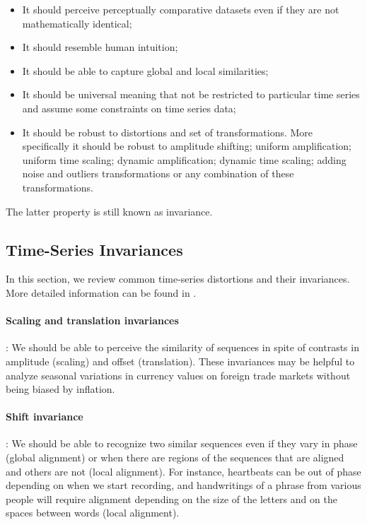 \begin{itemize}
\item It should perceive perceptually comparative datasets even if  they are not mathematically identical;
\item It should resemble human intuition;
\item It should be able to capture global and local similarities;
\item It should be universal meaning that not be restricted to particular time series and assume some constraints on time series data;
\item It should be robust to distortions and set of transformations. More specifically it should be robust to amplitude
shifting; uniform amplification; uniform time scaling; dynamic amplification; dynamic time scaling; adding noise and outliers transformations or any combination of these transformations.
\end{itemize}
The latter property is still known as invariance.

\subsection{Time-Series Invariances}
In this section, we review common time-series distortions and their invariances. More detailed information can be found in \cite{batista2014cid}. 

\paragraph{Scaling and translation invariances}:  We should be able to perceive the similarity of sequences in spite of contrasts in amplitude (scaling) and offset (translation). These invariances may be helpful to analyze seasonal variations in currency values on foreign trade markets without being biased by inflation.


\paragraph{Shift invariance}:  We should be able to recognize two similar sequences even if they vary in phase (global alignment) or when there are regions of the sequences that are aligned and others are not (local alignment). For instance, heartbeats can be out of phase depending on when we start recording, and handwritings of a phrase from various people will require alignment depending on the size of the letters and on the spaces between words (local alignment).



